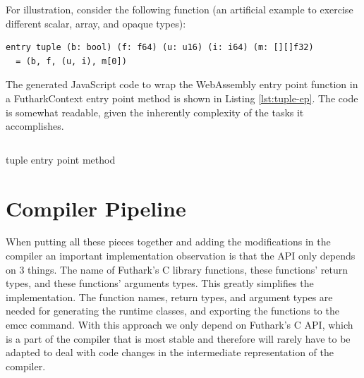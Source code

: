 \documentclass[11pt]{book}
\begin{document}
For illustration, consider the following function (an artificial example to exercise different scalar, array, and opaque types):
\begin{verbatim}
entry tuple (b: bool) (f: f64) (u: u16) (i: i64) (m: [][]f32)
  = (b, f, (u, i), m[0])
\end{verbatim}
The generated JavaScript code to wrap the WebAssembly entry point function in a FutharkContext entry point method is shown in Listing \ref{lst:tuple-ep}.
The code is somewhat readable, given the inherently complexity of the tasks it accomplishes.
\begin{listing}[H] 
        \inputminted[fontsize=\small,baselinestretch=0.5,linenos]{JavaScript}{code/compiler/api_examples/tuple-ep.js}
        \caption{tuple entry point method}
        \label{lst:tuple-ep}    
\end{listing} 



\section{Compiler Pipeline}

When putting all these pieces together and adding the modifications in the compiler an important implementation observation is that the API only depends on 3 things. The name of Futhark's C library functions, these functions' return types, and these functions' arguments types. This greatly simplifies the implementation. The function names, return types, and argument types are needed for generating the runtime classes, and exporting the functions to the emcc command. 
With this approach we only depend on Futhark's C API, which is a part of the compiler that is most stable and therefore will rarely have to be adapted to deal with code changes in the intermediate representation of the compiler.


\end{document}
